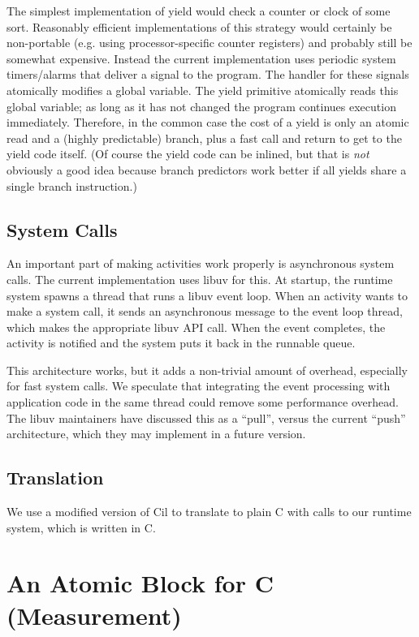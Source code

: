 \documentclass[sigplan,10pt,review,anonymous]{acmart}\settopmatter{printfolios=true,printccs=false,printacmref=false}
\begin{document}
The simplest implementation of yield would check a counter or clock of some sort.
Reasonably efficient implementations of this strategy would certainly be non-portable (e.g. using processor-specific counter registers) and probably still be somewhat expensive.
Instead the current \charcoal{} implementation uses periodic system timers/alarms that deliver a signal to the program.
The handler for these signals atomically modifies a global variable.
The yield primitive atomically reads this global variable; as long as it has not changed the program continues execution immediately.
Therefore, in the common case the cost of a yield is only an atomic read and a (highly predictable) branch, plus a fast call and return to get to the yield code itself.
(Of course the yield code can be inlined, but that is \emph{not} obviously a good idea because branch predictors work better if all yields share a single branch instruction.)

\subsection{System Calls}

An important part of making activities work properly is asynchronous system calls.
The current \charcoal{} implementation uses libuv for this.
At startup, the runtime system spawns a thread that runs a libuv event loop.
When an activity wants to make a system call, it sends an asynchronous message to the event loop thread, which makes the appropriate libuv API call.
When the event completes, the activity is notified and the system puts it back in the runnable queue.

This architecture works, but it adds a non-trivial amount of overhead, especially for fast system calls.
We speculate that integrating the event processing with application code in the same thread could remove some performance overhead.
The libuv maintainers have discussed this as a ``pull'', versus the current ``push'' architecture, which they may implement in a future version.

\subsection{Translation}

We use a modified version of Cil \cite{Necula2002} to translate \charcoal{} to plain C with calls to our runtime system, which is written in C.

\section{An Atomic Block for C (Measurement)}
\end{document}
